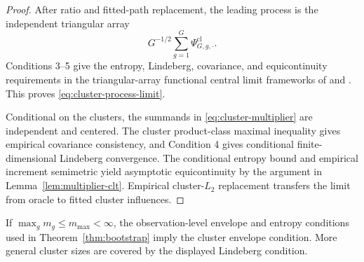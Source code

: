 \begin{proof}
After ratio and fitted-path replacement, the leading process is the independent triangular array
\[
G^{-1/2}\sum_{g=1}^G\Psi_{G,g,\cdot}^{\mathrm{cl}}.
\]
Conditions 3--5 give the entropy, Lindeberg, covariance, and equicontinuity requirements in the triangular-array functional central limit frameworks of \citet{Ziegler1997} and \citet{Arcones1999}. This proves \eqref{eq:cluster-process-limit}.

Conditional on the clusters, the summands in \eqref{eq:cluster-multiplier} are independent and centered. The cluster product-class maximal inequality gives empirical covariance consistency, and Condition 4 gives conditional finite-dimensional Lindeberg convergence. The conditional entropy bound and empirical increment semimetric yield asymptotic equicontinuity by the argument in Lemma~\ref{lem:multiplier-clt}. Empirical cluster-\(L_2\) replacement transfers the limit from oracle to fitted cluster influences.
\end{proof}

If \(\max_gm_g\le m_{\max}<\infty\), the observation-level envelope and entropy conditions used in Theorem~\ref{thm:bootstrap} imply the cluster envelope condition. More general cluster sizes are covered by the displayed Lindeberg condition.
